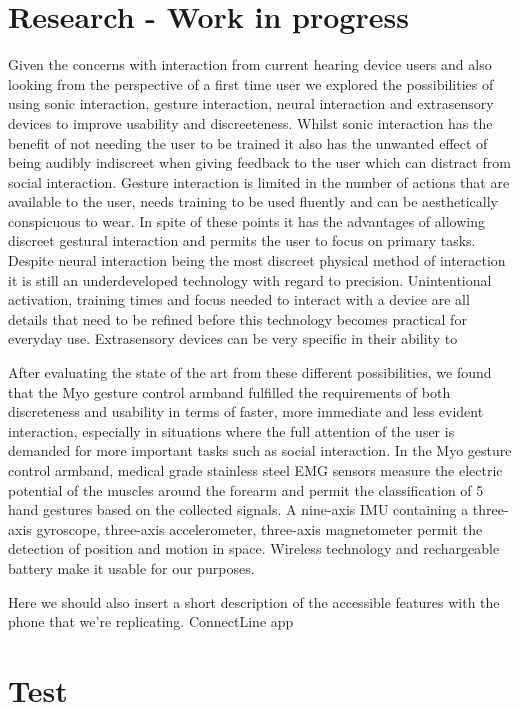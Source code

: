 \documentclass[journal]{./IEEEtran}
\begin{document}
\section{Research - Work in progress}
Given the concerns with interaction from current hearing device users and also looking from the perspective of a first time user we explored the possibilities of using sonic interaction, gesture interaction, neural interaction and extrasensory devices to improve usability and discreeteness. 
Whilst sonic interaction has the benefit of not needing the user to be trained it also has the unwanted effect of being audibly indiscreet when giving feedback to the user which can distract from social interaction.
Gesture interaction is limited in the number of actions that are available to the user, needs training to be used fluently and can be aesthetically conspicuous to wear. In spite of these points it has the advantages of allowing discreet gestural interaction and permits the user to focus on primary tasks.
Despite neural interaction being the most discreet physical method of interaction it is still an underdeveloped technology with regard to precision. Unintentional activation, training times and focus needed to interact with a device are all details that need to be refined before this technology becomes practical for everyday use.
Extrasensory devices can be very specific in their ability to 

After evaluating the state of the art from these different possibilities, we found that the Myo gesture control armband fulfilled the requirements of both discreteness and usability in terms of faster, more immediate and less evident interaction, especially in situations where the full attention of the user is demanded for more important tasks such as social interaction.
In the Myo gesture control armband, medical grade stainless steel EMG sensors measure the electric potential of the muscles around the forearm and permit the classification of 5 hand gestures based on the collected signals. A nine-axis IMU containing a three-axis gyroscope, three-axis accelerometer, three-axis magnetometer permit the detection of position and motion in space. Wireless technology and rechargeable battery make it usable for our purposes.



Here we should also insert a short description of the accessible features with the phone that we’re replicating. ConnectLine app 

\section{Test}
\end{document}
